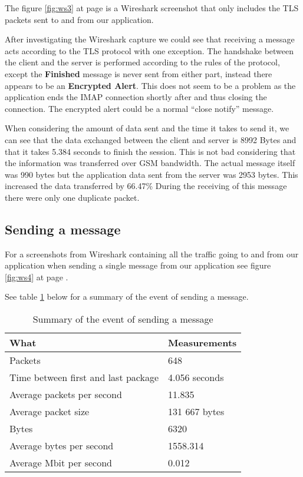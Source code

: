 The figure \ref{fig:ws3} at page \pageref{fig:ws3} is a Wireshark screenshot that only includes the TLS packets sent to and from our application.

After investigating the Wireshark capture we could see that receiving a message acts according to the TLS protocol with one exception. The handshake between the client and the server is performed according to the rules of the protocol, except the \textbf{Finished}  message is never sent from either part, instead there appears to be an \textbf{Encrypted Alert}. This does not seem to be a problem as the application ends the IMAP connection shortly after and thus closing the connection. The encrypted alert could be a normal “close notify” message.

\pagebreak

When considering the amount of data sent and the time it takes to send it, we can see that the data exchanged between the client and server is 8992 Bytes and that it takes 5.384 seconds to finish the session. This is not bad considering that the information was transferred over GSM bandwidth. The actual message itself was 990 bytes but the application data sent from the server was 2953 bytes. This increased the data transferred by 66.47\% During the receiving of this message there were only one duplicate packet.

\subsection{Sending a message}

For a screenshots from Wireshark containing all the traffic going to and from our application when sending a single message from our application see figure \ref{fig:ws4} at page \pageref{fig:ws4}.

See table \ref{tab:summarysenmes} below for a summary of the event of sending a message.
\begin{table}[h!]
\begin{center}
\begin{tabular}{l|l} \hline
\textbf{What} & \textbf{Measurements} \\ \hline \hline
Packets & 648 \\
Time between first and last package & 4.056 seconds \\
Average packets per second & 11.835 \\
Average packet size & 131 667 bytes \\
Bytes & 6320 \\
Average bytes per second & 1558.314 \\
Average Mbit per second & 0.012 \\ \hline
\end{tabular}
\end{center}
\caption{Summary of the event of sending a message} \label{tab:summarysenmes}
\end{table}

